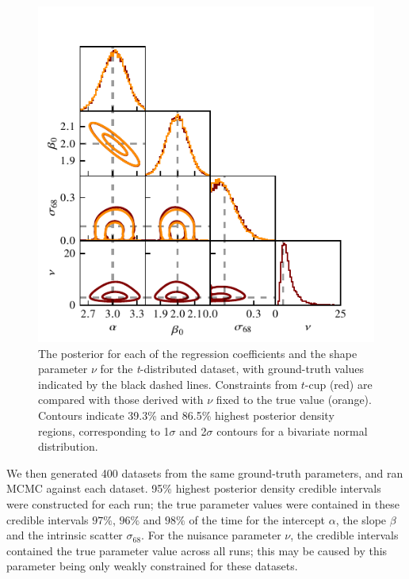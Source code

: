 \documentclass[fleqn,usenatbib]{rasti}
\begin{document}
\begin{figure}
    \includegraphics[width=\columnwidth]{graphics/fixed/corner_t.pdf}
    \caption{The posterior for each of the regression coefficients and the shape
    parameter $\nu$ for the \textit{t}-distributed dataset, with ground-truth
    values indicated by the black dashed lines. Constraints from $t$-cup (red)
    are compared with those derived with $\nu$ fixed to the true value (orange).
    Contours indicate 39.3\% and 86.5\% highest posterior density regions,
    corresponding to 1$\sigma$ and 2$\sigma$ contours for a bivariate normal
    distribution.}
    \label{fig:results.t.corner}
\end{figure}

We then generated 400 datasets from the same ground-truth parameters, and ran
MCMC against each dataset.
95\% highest posterior density credible intervals were constructed for each run;
the true parameter values were contained in these credible intervals $97\%$,
$96\%$ and $98\%$ of the time for the intercept $\alpha$, the slope $\beta$ and
the intrinsic scatter $\sigma_{68}$. For the nuisance parameter $\nu$, the
credible intervals contained the true parameter value across all runs; this may
be caused by this parameter being only weakly constrained for these datasets.
\end{document}
